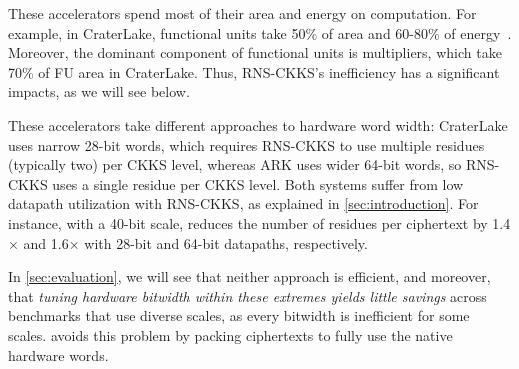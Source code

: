 These accelerators spend most of their area and energy on computation.
For example, in CraterLake, functional units take 50\% of area and 60-80\% of
energy~\cite{samardzic:isca22:craterlake}.
Moreover, the dominant component of functional units is multipliers, which take
70\% of FU area in CraterLake.
Thus, RNS-CKKS's inefficiency has a significant impacts, as we will see below.

These accelerators take different approaches to hardware word width:
CraterLake uses narrow 28-bit words, which requires RNS-CKKS to use multiple residues
(typically two) per CKKS level, whereas ARK uses wider 64-bit words,
so RNS-CKKS uses a single residue per CKKS level.
Both systems suffer from low datapath utilization with
RNS-CKKS, as explained in \autoref{sec:introduction}.
For instance, with a 40-bit scale, \name reduces the number of residues per
ciphertext by 1.4$\times$ and 1.6$\times$ with 28-bit and 64-bit datapaths,
respectively.


In \autoref{sec:evaluation}, we will see that neither approach is efficient,
and moreover, that \emph{tuning hardware bitwidth within these extremes yields
little savings} across benchmarks that use diverse scales, as every bitwidth is
inefficient for some scales.
\name avoids this problem by packing ciphertexts to fully use the native
hardware words.


